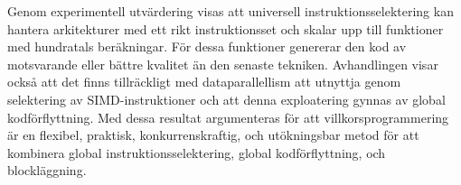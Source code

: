 \begin{sammanfattning}
  Genom experimentell utv\"ardering visas att universell instruktionsselektering
  kan hantera arkitekturer med ett rikt instruktionsset och skalar upp till
  funktioner med hundratals ber\"akningar.
  F\"or dessa funktioner genererar den kod av motsvarande eller b\"attre
  kvalitet \"an den senaste tekniken.
  Avhandlingen visar ocks\r{a} att det finns tillr\"ackligt med dataparallellism
  att utnyttja genom selektering av SIMD-instruktioner och att denna
  exploatering gynnas av global kodf\"orflyttning.
  Med dessa resultat argumenteras f\"or att villkorsprogrammering \"ar en
  flexibel, praktisk, konkurrenskraftig, och ut\"okningsbar metod f\"or att
  kombinera global instruktionsselektering, global kodf\"orflyttning, och
  blockl\"aggning.
\end{sammanfattning}
